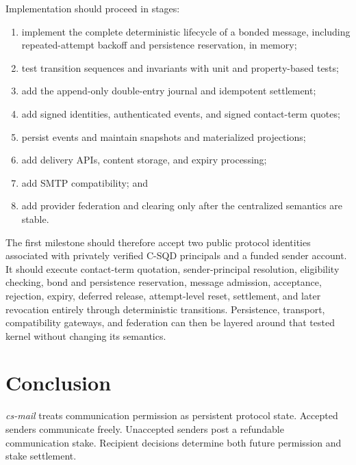 \documentclass[11pt]{article}
\begin{document}
Implementation should proceed in stages:

\begin{enumerate}[leftmargin=2em]
    \item implement the complete deterministic lifecycle of a bonded message, including repeated-attempt backoff and persistence reservation, in memory;
    \item test transition sequences and invariants with unit and property-based tests;
    \item add the append-only double-entry journal and idempotent settlement;
    \item add signed identities, authenticated events, and signed contact-term quotes;
    \item persist events and maintain snapshots and materialized projections;
    \item add delivery APIs, content storage, and expiry processing;
    \item add SMTP compatibility; and
    \item add provider federation and clearing only after the centralized semantics are stable.
\end{enumerate}

The first milestone should therefore accept two public protocol identities associated with privately verified C-SQD principals and a funded sender account. It should execute contact-term quotation, sender-principal resolution, eligibility checking, bond and persistence reservation, message admission, acceptance, rejection, expiry, deferred release, attempt-level reset, settlement, and later revocation entirely through deterministic transitions. Persistence, transport, compatibility gateways, and federation can then be layered around that tested kernel without changing its semantics.

\section{Conclusion}

\textit{cs-mail} treats communication permission as persistent protocol state. Accepted senders communicate freely. Unaccepted senders post a refundable communication stake. Recipient decisions determine both future permission and stake settlement.
\end{document}
